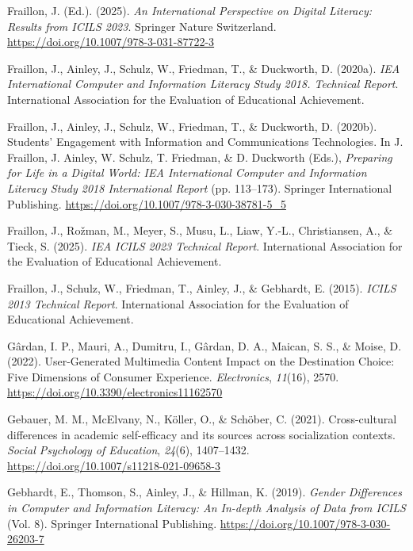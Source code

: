 \documentclass[
  letterpaper,
  DIV=11,
  numbers=noendperiod]{scrartcl}
\newlength{\cslhangindent}
\newenvironment{CSLReferences}[2] %
 {\begin{list}{}{%
  \setlength{\itemindent}{0pt}
  \setlength{\leftmargin}{0pt}
  \setlength{\parsep}{0pt}
  \ifodd #1
   \setlength{\leftmargin}{\cslhangindent}
   \setlength{\itemindent}{-1\cslhangindent}
  \fi
  \setlength{\itemsep}{#2\baselineskip}}}
 {\end{list}}
\begin{document}
\begin{CSLReferences}{1}{0}
Fraillon, J. (Ed.). (2025). \emph{An {International Perspective} on
{Digital Literacy}: {Results} from {ICILS} 2023}. Springer Nature
Switzerland. \url{https://doi.org/10.1007/978-3-031-87722-3}

Fraillon, J., Ainley, J., Schulz, W., Friedman, T., \& Duckworth, D.
(2020a). \emph{{IEA International Computer} and {Information Literacy
Study} 2018. {Technical Report}}. International Association for the
Evaluation of Educational Achievement.

Fraillon, J., Ainley, J., Schulz, W., Friedman, T., \& Duckworth, D.
(2020b). Students' {Engagement} with {Information} and {Communications
Technologies}. In J. Fraillon, J. Ainley, W. Schulz, T. Friedman, \& D.
Duckworth (Eds.), \emph{Preparing for {Life} in a {Digital World}: {IEA
International Computer} and {Information Literacy Study} 2018
{International Report}} (pp. 113--173). Springer International
Publishing. \url{https://doi.org/10.1007/978-3-030-38781-5_5}

Fraillon, J., Rožman, M., Meyer, S., Musu, L., Liaw, Y.-L.,
Christiansen, A., \& Tieck, S. (2025). \emph{{IEA ICILS} 2023 {Technical
Report}}. International Association for the Evaluation of Educational
Achievement.

Fraillon, J., Schulz, W., Friedman, T., Ainley, J., \& Gebhardt, E.
(2015). \emph{{ICILS} 2013 {Technical Report}}. International
Association for the Evaluation of Educational Achievement.

Gârdan, I. P., Mauri, A., Dumitru, I., Gârdan, D. A., Maican, S. S., \&
Moise, D. (2022). User-{Generated Multimedia Content Impact} on the
{Destination Choice}: {Five Dimensions} of {Consumer Experience}.
\emph{Electronics}, \emph{11}(16), 2570.
\url{https://doi.org/10.3390/electronics11162570}

Gebauer, M. M., McElvany, N., Köller, O., \& Schöber, C. (2021).
Cross-cultural differences in academic self-efficacy and its sources
across socialization contexts. \emph{Social Psychology of Education},
\emph{24}(6), 1407--1432.
\url{https://doi.org/10.1007/s11218-021-09658-3}

Gebhardt, E., Thomson, S., Ainley, J., \& Hillman, K. (2019).
\emph{Gender {Differences} in {Computer} and {Information Literacy}: {An
In-depth Analysis} of {Data} from {ICILS}} (Vol. 8). Springer
International Publishing.
\url{https://doi.org/10.1007/978-3-030-26203-7}


\end{CSLReferences}
\end{document}

